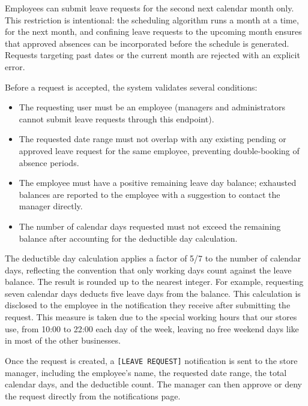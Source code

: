 \par Employees can submit leave requests for the second next calendar month only. This restriction is intentional: the scheduling algorithm runs a month at a time, for the next month, and confining leave requests to the upcoming month ensures that approved absences can be incorporated before the schedule is generated. Requests targeting past dates or the current month are rejected with an explicit error.

\par Before a request is accepted, the system validates several conditions:

\begin{itemize}
    \item The requesting user must be an employee (managers and administrators cannot submit leave requests through this endpoint).
    \item The requested date range must not overlap with any existing pending or approved leave request for the same employee, preventing double-booking of absence periods.
    \item The employee must have a positive remaining leave day balance; exhausted balances are reported to the employee with a suggestion to contact the manager directly.
    \item The number of calendar days requested must not exceed the remaining balance after accounting for the deductible day calculation.
\end{itemize}

\par The deductible day calculation applies a factor of 5/7 to the number of calendar days, reflecting the convention that only working days count against the leave balance. The result is rounded up to the nearest integer. For example, requesting seven calendar days deducts five leave days from the balance. This calculation is disclosed to the employee in the notification they receive after submitting the request. This measure is taken due to the special working hours that our stores use, from 10:00 to 22:00 each day of the week, leaving no free weekend days like in most of the other businesses.

\par Once the request is created, a \texttt{[LEAVE REQUEST]} notification is sent to the store manager, including the employee's name, the requested date range, the total calendar days, and the deductible count. The manager can then approve or deny the request directly from the notifications page.


